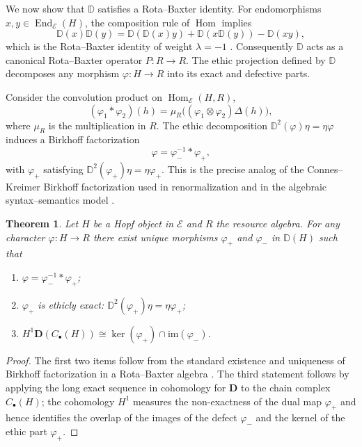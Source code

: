 \documentclass[12pt]{article}
\newcommand{\E}{\mathcal{E}}
\newcommand{\DD}{\mathbb{D}}
\newcommand{\Hom}{\operatorname{Hom}}
\newcommand{\End}{\operatorname{End}}
\theoremstyle{plain}
\newtheorem{theorem}{Theorem}[section]
\theoremstyle{definition}
\theoremstyle{remark}
\numberwithin{equation}{section}
\begin{document}
We now show that $\mathbb D$ satisfies a Rota--Baxter identity. For endomorphisms $x,y\in \End_\E(H)$, the composition rule of $\Hom$ implies
\begin{equation}
\mathbb D(x)\mathbb D(y)=\mathbb D(\mathbb D(x)y)+\mathbb D(x\mathbb D(y))-\mathbb D(xy),
\end{equation}
which is the Rota--Baxter identity of weight $\lambda=-1$ \cite{Guo2012}. Consequently $\mathbb D$ acts as a canonical Rota--Baxter operator $P:R\to R$. The ethic projection defined by $\mathbb D$ decomposes any morphism $\varphi:H\to R$ into its exact and defective parts.

Consider the convolution product on $\Hom_\E(H,R)$,
\begin{equation}
(\varphi_1*\varphi_2)(h)=\mu_R\big((\varphi_1\otimes\varphi_2)\Delta(h)\big),
\end{equation}
where $\mu_R$ is the multiplication in $R$. The ethic decomposition $\DD^2(\varphi)\eta=\eta\varphi$ induces a Birkhoff factorization
\begin{equation}
\varphi=\varphi_-^{-1}*\varphi_+,
\end{equation}
with $\varphi_+$ satisfying $\DD^2(\varphi_+)\eta=\eta\varphi_+$. This is the precise analog of the Connes--Kreimer Birkhoff factorization used in renormalization \cite{ConnesKreimer1998} and in the algebraic syntax--semantics model \cite{MarcolliBerwickChomsky2023}.

\begin{theorem}
Let $H$ be a Hopf object in $\E$ and $R$ the resource algebra. For any character $\varphi:H\to R$ there exist unique morphisms $\varphi_+$ and $\varphi_-$ in $\mathbb D(H)$ such that
\begin{enumerate}
\item $\varphi=\varphi_-^{-1}*\varphi_+$;
\item $\varphi_+$ is ethicly exact: $\DD^2(\varphi_+)\eta=\eta\varphi_+$;
\item $H^1\mathbf D(C_\bullet(H))\cong \ker(\varphi_+)\cap\mathrm{im}(\varphi_-)$.
\end{enumerate}
\end{theorem}

\begin{proof}
The first two items follow from the standard existence and uniqueness of Birkhoff factorization in a Rota--Baxter algebra \cite{Guo2012}. The third statement follows by applying the long exact sequence in cohomology for $\mathbf D$ to the chain complex $C_\bullet(H)$; the cohomology $H^1$ measures the non-exactness of the dual map $\varphi_+$ and hence identifies the overlap of the images of the defect $\varphi_-$ and the kernel of the ethic part $\varphi_+$.
\end{proof}
\end{document}
